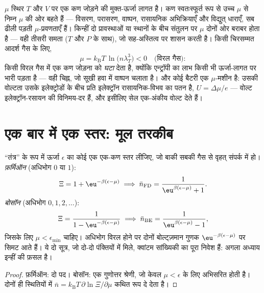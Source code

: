 \begin{definition}[$\mu$ का अर्थ]\label{def:b3:grand-canonical:mu}
$\mu$ स्थिर $T$ और $V$ पर एक कण जोड़ने की मुक्त-ऊर्जा लागत है। कण
स्वतःस्फूर्त रूप से उच्च $\mu$ से निम्न
$\mu$ की ओर बहते हैं --- विसरण, परासरण, वाष्पन, रासायनिक
अभिक्रियाएँ और विद्युत् धाराएँ, सब ढीली पड़ती $\mu$-प्रवणताएँ हैं।
किन्हीं दो प्रावस्थाओं या स्थानों के बीच संतुलन पर $\mu$ दोनों ओर
बराबर होता है --- वही तीसरी समता ($T$ और $P$ के साथ), जो सह-अस्तित्व
पर शासन करती है। किसी
चिरसम्मत आदर्श गैस के लिए,
\[
\mu = k_{\text{B}}T\,\ln\!\big(n\lambda_T^3\big) < 0
\quad\text{(विरल गैस)} :
\]
किसी विरल गैस में एक कण जोड़ना  को \emph{घटा} देता है,
क्योंकि एन्ट्रॉपी का लाभ किसी भी ऊर्जा-लागत पर भारी पड़ता है --- वही
चिह्न, जो सूखी हवा में वाष्पन चलाता है। और कोई बैटरी एक $\mu$-मशीन
है: उसकी वोल्टता उसके इलेक्ट्रोडों के बीच प्रति इलेक्ट्रॉन
रासायनिक-विभव का पतन है, $U = \Delta\mu/e$ --- वोल्ट इलेक्ट्रॉन-रसायन
की विनिमय-दर हैं, और इसीलिए सेल एक-अंकीय वोल्ट देते हैं।
\end{definition}

\section{एक बार में एक स्तर: मूल तरकीब}

\begin{theorem}[किसी एक क्वांटम स्तर का अधिभोग]\label{thm:b3:grand-canonical:occupation}
``तंत्र'' के रूप में ऊर्जा $\epsilon$ का कोई एक एक-कण स्तर लीजिए, जो
बाकी सबकी गैस से वृहत् संपर्क में हो।
\emph{फ़र्मिऑन} (अधिभोग $0$ या $1$):
\[
\Xi = 1 + \eu^{-\beta(\epsilon - \mu)}
\;\Longrightarrow\;
\bar n_{\text{FD}} = \frac{1}{\eu^{\beta(\epsilon - \mu)} + 1} .
\]
\emph{बोसॉन} (अधिभोग $0, 1, 2, \dots$):
\[
\Xi = \frac{1}{1 - \eu^{-\beta(\epsilon - \mu)}}
\;\Longrightarrow\;
\bar n_{\text{BE}} = \frac{1}{\eu^{\beta(\epsilon - \mu)} - 1} ,
\]
जिसके लिए $\mu < \epsilon_{\min}$ चाहिए। अधिभोग विरल होने पर दोनों
बोल्ट्ज़मान गुणक $\eu^{-\beta(\epsilon - \mu)}$ पर सिमट आते हैं।
ये दो सूत्र, जो दो-दो पंक्तियों में मिले, क्वांटम सांख्यिकी का पूरा
निवेश हैं: अगला अध्याय इन्हीं की फ़सल है।
\end{theorem}

\begin{proof}
फ़र्मिऑन: दो पद। बोसॉन: एक गुणोत्तर श्रेणी, जो केवल
$\mu < \epsilon$ के लिए अभिसरित होती है। दोनों ही स्थितियों में $\bar n = k_{\text{B}}T\,
\partial\ln\Xi/\partial\mu$ कथित रूप दे देता है।
\end{proof}

